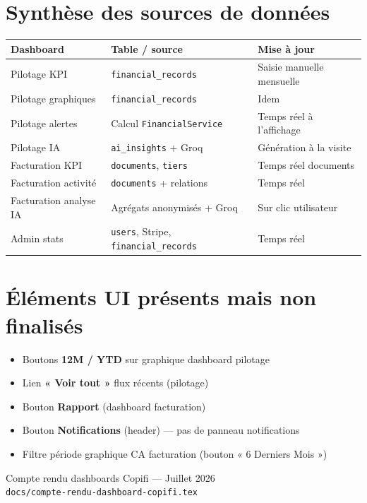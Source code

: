 \documentclass[11pt,a4paper]{report}
\newcommand{\filepath}[1]{\texttt{\small #1}}
\begin{document}
\chapter{Synthèse des sources de données}

\begin{center}
\begin{tabular}{@{}p{4.5cm}p{4cm}p{5.8cm}@{}}
\toprule
\textbf{Dashboard} & \textbf{Table / source} & \textbf{Mise à jour} \\
\midrule
Pilotage KPI & \texttt{financial\_records} & Saisie manuelle mensuelle \\
Pilotage graphiques & \texttt{financial\_records} & Idem \\
Pilotage alertes & Calcul \filepath{FinancialService} & Temps réel à l'affichage \\
Pilotage IA & \texttt{ai\_insights} + Groq & Génération à la visite \\
Facturation KPI & \texttt{documents}, \texttt{tiers} & Temps réel documents \\
Facturation activité & \texttt{documents} + relations & Temps réel \\
Facturation analyse IA & Agrégats anonymisés + Groq & Sur clic utilisateur \\
Admin stats & \texttt{users}, Stripe, \texttt{financial\_records} & Temps réel \\
\bottomrule
\end{tabular}
\end{center}

\chapter{Éléments UI présents mais non finalisés}

\begin{itemize}[leftmargin=1.5em]
    \item Boutons \textbf{12M / YTD} sur graphique dashboard pilotage
    \item Lien \textbf{« Voir tout »} flux récents (pilotage)
    \item Bouton \textbf{Rapport} (dashboard facturation)
    \item Bouton \textbf{Notifications} (header) — pas de panneau notifications
    \item Filtre période graphique CA facturation (bouton « 6 Derniers Mois »)
\end{itemize}

\vfill
\begin{center}
\small\color{copifizinc500}
Compte rendu dashboards Copifi — Juillet 2026\\
\filepath{docs/compte-rendu-dashboard-copifi.tex}
\end{center}
\end{document}
